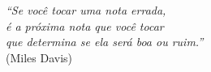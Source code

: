 \begin{epigrafe}
    \vspace*{\fill}
	\begin{flushright}

		\textit{``Se você tocar uma nota errada, \\
		é a próxima nota que você tocar \\
		que determina se ela será boa ou ruim.''}\\
		(Miles Davis)
	\end{flushright}
\end{epigrafe}
